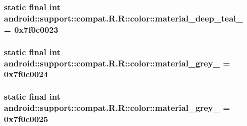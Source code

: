 \hypertarget{classandroid_1_1support_1_1compat_1_1_r_1_1color_8ae139527748fda77b158b6f0e482e58}{
\subsubsection[{material\_\-deep\_\-teal\_\-500}]{\setlength{\rightskip}{0pt plus 5cm}static final int android::support::compat.R.R::color::material\_\-deep\_\-teal\_ = 0x7f0c0023}}
\label{classandroid_1_1support_1_1compat_1_1_r_1_1color_8ae139527748fda77b158b6f0e482e58}


\hypertarget{classandroid_1_1support_1_1compat_1_1_r_1_1color_ad107fac7479d12956adaeb1a37bde7e}{
\subsubsection[{material\_\-grey\_\-100}]{\setlength{\rightskip}{0pt plus 5cm}static final int android::support::compat.R.R::color::material\_\-grey\_ = 0x7f0c0024}}
\label{classandroid_1_1support_1_1compat_1_1_r_1_1color_ad107fac7479d12956adaeb1a37bde7e}


\hypertarget{classandroid_1_1support_1_1compat_1_1_r_1_1color_6434dfbec167ef20210e1fe99efef90d}{
\subsubsection[{material\_\-grey\_\-300}]{\setlength{\rightskip}{0pt plus 5cm}static final int android::support::compat.R.R::color::material\_\-grey\_ = 0x7f0c0025}}
\label{classandroid_1_1support_1_1compat_1_1_r_1_1color_6434dfbec167ef20210e1fe99efef90d}


